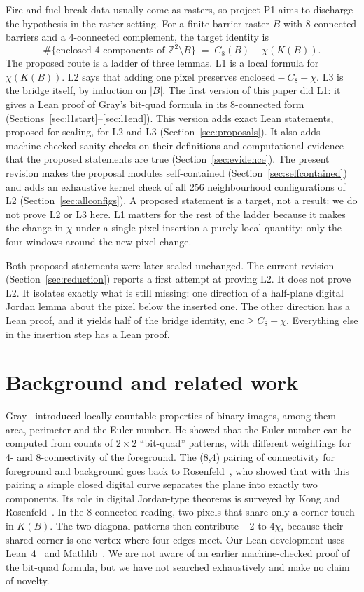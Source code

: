 \documentclass[11pt]{article}
\theoremstyle{definition}
\theoremstyle{remark}
\begin{document}
Fire and fuel-break data usually come as rasters, so project P1 aims to
discharge the hypothesis in the raster setting. For a finite barrier raster $B$
with 8-connected barriers and a 4-connected complement, the target identity is
\[
  \#\{\text{enclosed 4-components of } \mathbb{Z}^2\setminus B\}
  \;=\; C_8(B) - \chi(K(B)).
\]
The proposed route is a ladder of three lemmas. L1 is a local formula for
$\chi(K(B))$. L2 says that adding one pixel preserves
$\text{enclosed} - C_8 + \chi$. L3 is the bridge itself, by induction on $|B|$.
The first version of this paper did L1: it gives a Lean proof of Gray's
bit-quad formula in its 8-connected form (Sections~\ref{sec:l1start}--\ref{sec:l1end}).
This version adds exact Lean statements, proposed for sealing, for L2 and L3
(Section~\ref{sec:proposals}). It also adds machine-checked sanity checks on
their definitions and computational evidence that the proposed statements are
true (Section~\ref{sec:evidence}). The present revision makes the proposal
modules self-contained (Section~\ref{sec:selfcontained}) and adds an exhaustive
kernel check of all 256 neighbourhood configurations of L2
(Section~\ref{sec:allconfigs}). A proposed statement is a target, not a
result: we do not prove L2 or L3 here. L1 matters for the rest of the ladder because it makes the
change in $\chi$ under a single-pixel insertion a purely local quantity: only
the four windows around the new pixel change.

Both proposed statements were later sealed unchanged. The current revision
(Section~\ref{sec:reduction}) reports a first attempt at proving L2. It does not
prove L2. It isolates exactly what is still missing: one direction of a
half-plane digital Jordan lemma about the pixel below the inserted one. The other
direction has a Lean proof, and it yields half of the bridge identity,
$\mathrm{enc}\ge C_8-\chi$. Everything else in the
insertion step has a Lean proof.

\section{Background and related work}

Gray~\cite{Gray1971} introduced locally countable properties of binary images,
among them area, perimeter and the Euler number. He showed that the Euler number
can be computed from counts of $2\times2$ ``bit-quad'' patterns, with different
weightings for 4- and 8-connectivity of the foreground. The (8,4) pairing of
connectivity for foreground and background goes back to
Rosenfeld~\cite{Rosenfeld1970}, who showed that with this pairing a simple closed
digital curve separates the plane into exactly two components. Its role in
digital Jordan-type theorems is surveyed by Kong and
Rosenfeld~\cite{KongRosenfeld1989}.
In the 8-connected reading, two pixels that share only a corner touch in $K(B)$.
The two diagonal patterns then contribute $-2$ to $4\chi$, because their
shared corner is one vertex where four edges meet. Our Lean development uses
Lean~4~\cite{Lean4} and Mathlib~\cite{Mathlib2020}. We are not aware of an
earlier machine-checked proof of the bit-quad formula, but we have not searched
exhaustively and make no claim of novelty.
\end{document}
